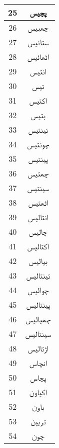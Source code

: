 \begin{longtable}[c]{|c|c|}
25              & \texturdu{پچیس}     \\ \hline
26              & \texturdu{چھبیس}    \\ \hline
27              & \texturdu{ستائیس}   \\ \hline
28              & \texturdu{اٹھائیس}  \\ \hline
29              & \texturdu{انتیس}    \\ \hline
30              & \texturdu{تیس}      \\ \hline
31              & \texturdu{اکتیس}    \\ \hline
32              & \texturdu{بتیس}     \\ \hline
33              & \texturdu{تینتیس}   \\ \hline
34              & \texturdu{چونتیس}   \\ \hline
35              & \texturdu{پینتیس}   \\ \hline
36              & \texturdu{چھتیس}    \\ \hline
37              & \texturdu{سینتیس}   \\ \hline
38              & \texturdu{اٹھتیس}   \\ \hline
39              & \texturdu{انتالیس}  \\ \hline
40              & \texturdu{چالیس}    \\ \hline
41              & \texturdu{اکتالیس}  \\ \hline
42              & \texturdu{بیالیس}   \\ \hline
43              & \texturdu{تینتالیس} \\ \hline
44              & \texturdu{چوالیس}   \\ \hline
45              & \texturdu{پینتالیس} \\ \hline
46              & \texturdu{چھیالیس}  \\ \hline
47              & \texturdu{سینتالیس} \\ \hline
48              & \texturdu{اڑتالیس}  \\ \hline
49              & \texturdu{انچاس}    \\ \hline
50              & \texturdu{پچاس}     \\ \hline
51              & \texturdu{اکیاون}   \\ \hline
52              & \texturdu{باون}     \\ \hline
53              & \texturdu{تریپن}    \\ \hline
54              & \texturdu{چون}      \\ \hline

\end{longtable}
